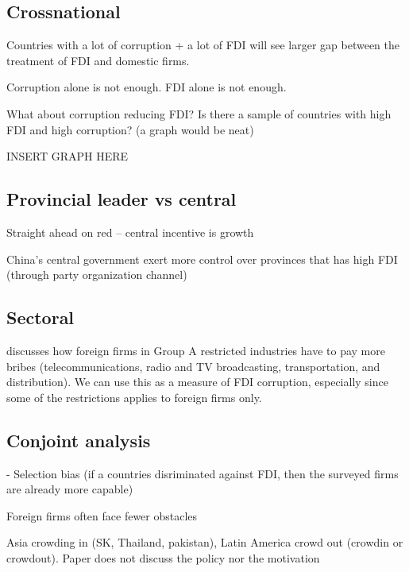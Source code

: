 \documentclass[12pt]{article}
\begin{document}
\subsection{Crossnational}

Countries with a lot of corruption + a lot of FDI will see larger gap between the treatment of FDI and domestic firms.

Corruption alone is not enough. FDI alone is not enough.

What about corruption reducing FDI? Is there a sample of countries with high FDI and high corruption? (a graph would be neat)

INSERT GRAPH HERE


\subsection{Provincial leader vs central}

\citep{Malesky2008} Straight ahead on red -- central incentive is growth

\citep{Sheng2007} China's central government exert more control over provinces that has high FDI (through party organization channel)

\subsection{Sectoral}

\citep{Malesky2015} discusses how foreign firms in Group A restricted industries have to pay more bribes (telecommunications, radio and TV broadcasting, transportation, and distribution). We can use this as a measure of FDI corruption, especially since some of the restrictions applies to foreign firms only.


\subsection{Conjoint analysis}



- Selection bias (if a countries disriminated against FDI, then the surveyed firms are already more capable)



Foreign firms often face fewer obstacles

Asia crowding in (SK, Thailand, pakistan), Latin America crowd out (crowdin or crowdout). Paper does not discuss the policy nor the motivation
\end{document}

